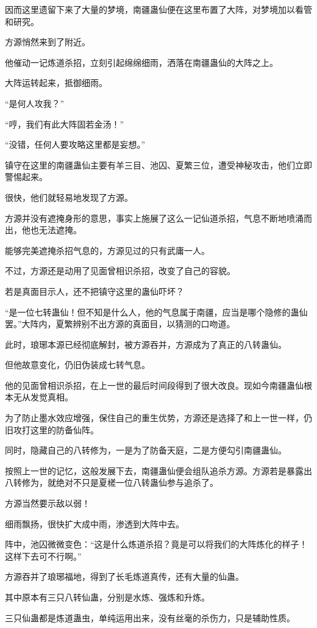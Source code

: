 \begin{this_body}
因而这里遗留下来了大量的梦境，南疆蛊仙便在这里布置了大阵，对梦境加以看管和研究。

方源悄然来到了附近。

他催动一记炼道杀招，立刻引起绵绵细雨，洒落在南疆蛊仙的大阵之上。

大阵运转起来，抵御细雨。

“是何人攻我？”

“哼，我们有此大阵固若金汤！”

“没错，任何人要攻略这里都是妄想。”

镇守在这里的南疆蛊仙主要有羊三目、池囚、夏繁三位，遭受神秘攻击，他们立即警惕起来。

很快，他们就轻易地发现了方源。

方源并没有遮掩身形的意思，事实上施展了这么一记仙道杀招，气息不断地喷涌而出，他也无法遮掩。

能够完美遮掩杀招气息的，方源见过的只有武庸一人。

不过，方源还是动用了见面曾相识杀招，改变了自己的容貌。

若是真面目示人，还不把镇守这里的蛊仙吓坏？

“是一位七转蛊仙！但不知是什么人，他的气息属于南疆，应当是哪个隐修的蛊仙罢。”大阵内，夏繁辨别不出方源的真面目，以猜测的口吻道。

此时，琅琊本源已经彻底解封，被方源吞并，方源成为了真正的八转蛊仙。

但他故意变化，仍旧伪装成七转气息。

他的见面曾相识杀招，在上一世的最后时间段得到了很大改良。现如今南疆蛊仙根本无从发觉真相。

为了防止墨水效应增强，保住自己的重生优势，方源还是选择了和上一世一样，仍旧攻打这里的防备仙阵。

同时，隐藏自己的八转修为，一是为了防备天庭，二是方便勾引南疆蛊仙。

按照上一世的记忆，这般发展下去，南疆蛊仙便会组队追杀方源。方源若是暴露出八转修为，就绝对不只是夏槎一位八转蛊仙参与追杀了。

方源当然要示敌以弱！

细雨飘扬，很快扩大成中雨，渗透到大阵中去。

阵中，池囚微微变色：“这是什么炼道杀招？竟是可以将我们的大阵炼化的样子！这样下去可不行啊。”

方源吞并了琅琊福地，得到了长毛炼道真传，还有大量的仙蛊。

其中原本有三只八转仙蛊，分别是水炼、强炼和升炼。

三只仙蛊都是炼道蛊虫，单纯运用出来，没有丝毫的杀伤力，只是辅助性质。


\end{this_body}
